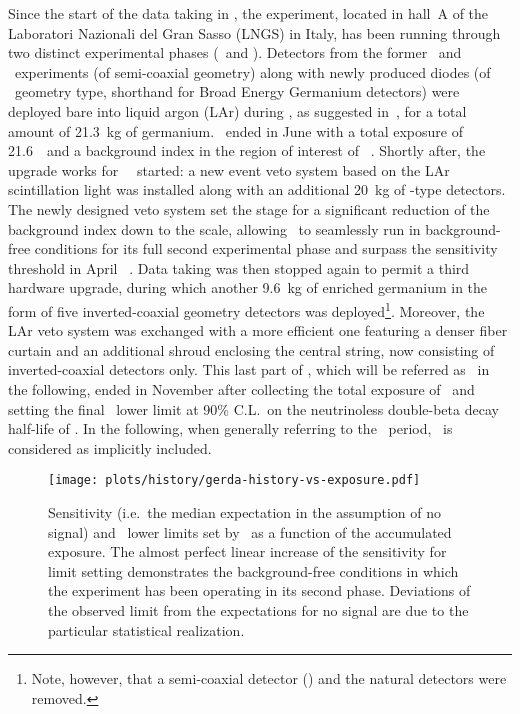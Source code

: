 Since the start of the data taking in , the experiment, located in hall~A of the
Laboratori Nazionali del Gran Sasso (LNGS) in Italy, has been running through two distinct
experimental phases (\phaseone\ and \phasetwo). Detectors from the former \hdm\ and \igex\
experiments (of semi-coaxial geometry) along with newly produced diodes (of \bege\
geometry type, shorthand for Broad Energy Germanium detectors) were deployed bare into
liquid argon (LAr) during \phaseone, as suggested in~\cite{Heusser1995},
for a total amount of 21.3~kg of germanium. \phaseone\ ended in June \yr{2013} with a total
exposure of 21.6~\kgyr\ and a background index in the region of interest of
\pIbi~\cite{Agostini2016}.  Shortly after, the upgrade works for \gerda\ \phasetwo\ started:
a new event veto system based on the LAr scintillation light was installed along with an
additional 20~kg of \bege-type detectors.  The newly designed veto system set the stage for a
significant reduction of the background index down to the \powctsper{-4} scale, allowing
\gerda\ to seamlessly run in background-free conditions for its full second experimental phase
and surpass the \powtenyr{26} sensitivity threshold in April \yr{2018}~\cite{Agostini2019a}.
Data taking was then stopped again to permit a third hardware upgrade, during which
another 9.6~kg of enriched germanium in the form of five inverted-coaxial geometry
detectors was deployed\footnote{Note, however, that a semi-coaxial detector (\ANG{1}) and
the natural \GTF{} detectors were removed.}. Moreover, the LAr veto system was exchanged
with a more efficient one featuring a denser fiber curtain and an additional shroud
enclosing the central string, now consisting of inverted-coaxial detectors only. This last
part of \phasetwo, which will be referred as \phasetwop\ in the following, ended in
November \yr{2019} after collecting the total exposure of \gexpo\ and
setting the final \gerda\ lower limit at 90\% C.L.~on the neutrinoless double-beta decay half-life
of \gerdafinallimit. In the following, when generally referring to the \phasetwo\ period,
\phasetwop\ is considered as implicitly included.
\begin{figure}
  \centering
  \texttt{[image: plots/history/gerda-history-vs-exposure.pdf]}
  \caption{%
    Sensitivity (i.e.~the median expectation in the assumption of no signal) and
    \thalfzero\ lower limits set by \gerda\ as a function of the accumulated exposure. The
    almost perfect linear increase of the sensitivity for limit setting demonstrates the
    background-free conditions in which the experiment has been operating in its second
    phase. Deviations of the observed limit from the expectations for no signal are due to
    the particular statistical realization.
  }\label{fig:exp:gerda-history}
\end{figure}
